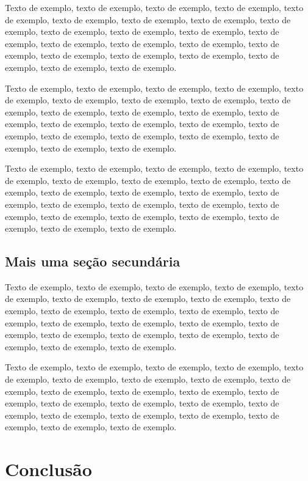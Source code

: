 \documentclass[
	12pt,				%
	oneside,			%
	a4paper,			%
	english,			%
	brazil				%
	]{abntex2ppgsi}
\begin{document}
Texto de exemplo, texto de exemplo, texto de exemplo, texto de exemplo, texto de exemplo, texto de exemplo, texto de exemplo, texto de exemplo, texto de exemplo, texto de exemplo, texto de exemplo, texto de exemplo, texto de exemplo, texto de exemplo, texto de exemplo, texto de exemplo, texto de exemplo, texto de exemplo, texto de exemplo, texto de exemplo, texto de exemplo, texto de exemplo, texto de exemplo.

Texto de exemplo, texto de exemplo, texto de exemplo, texto de exemplo, texto de exemplo, texto de exemplo, texto de exemplo, texto de exemplo, texto de exemplo, texto de exemplo, texto de exemplo, texto de exemplo, texto de exemplo, texto de exemplo, texto de exemplo, texto de exemplo, texto de exemplo, texto de exemplo, texto de exemplo, texto de exemplo, texto de exemplo, texto de exemplo, texto de exemplo.

Texto de exemplo, texto de exemplo, texto de exemplo, texto de exemplo, texto de exemplo, texto de exemplo, texto de exemplo, texto de exemplo, texto de exemplo, texto de exemplo, texto de exemplo, texto de exemplo, texto de exemplo, texto de exemplo, texto de exemplo, texto de exemplo, texto de exemplo, texto de exemplo, texto de exemplo, texto de exemplo, texto de exemplo, texto de exemplo, texto de exemplo.

\section{Mais uma seção secundária}

Texto de exemplo, texto de exemplo, texto de exemplo, texto de exemplo, texto de exemplo, texto de exemplo, texto de exemplo, texto de exemplo, texto de exemplo, texto de exemplo, texto de exemplo, texto de exemplo, texto de exemplo, texto de exemplo, texto de exemplo, texto de exemplo, texto de exemplo, texto de exemplo, texto de exemplo, texto de exemplo, texto de exemplo, texto de exemplo, texto de exemplo.

Texto de exemplo, texto de exemplo, texto de exemplo, texto de exemplo, texto de exemplo, texto de exemplo, texto de exemplo, texto de exemplo, texto de exemplo, texto de exemplo, texto de exemplo, texto de exemplo, texto de exemplo, texto de exemplo, texto de exemplo, texto de exemplo, texto de exemplo, texto de exemplo, texto de exemplo, texto de exemplo, texto de exemplo, texto de exemplo, texto de exemplo.

\chapter{Conclusão}
\end{document}
